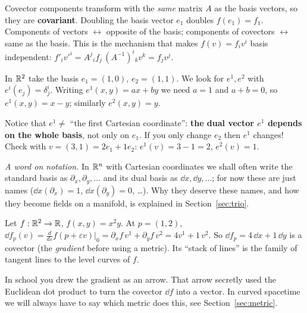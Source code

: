 \begin{intuition}[{covariant = changes like the basis}]
Covector components transform with the \emph{same} matrix $A$ as the basis vectors, so they are \textbf{covariant}. Doubling the basis vector $e_1$ doubles $f(e_1)=f_1$. Components of vectors $\leftrightarrow$ opposite of the basis; components of covectors $\leftrightarrow$ same as the basis. This is the mechanism that makes $f(v)=f_iv^i$ basis independent:
$f'_iv'^i=A^j{}_if_j\,(A^{-1})^i{}_kv^k=f_jv^j$.
\end{intuition}

\begin{example}
In $\mathbb{R}^2$ take the basis $e_1=(1,0)$, $e_2=(1,1)$. We look for $e^{1},e^{2}$ with $e^{i}(e_j)=\delta^i_j$. Writing $e^{1}(x,y)=ax+by$ we need $a=1$ and $a+b=0$, so $e^{1}(x,y)=x-y$; similarly $e^{2}(x,y)=y$.

Notice that $e^{1}\neq$ ``the first Cartesian coordinate'': \textbf{the dual vector $e^{1}$ depends on the whole basis}, not only on $e_1$. If you only change $e_2$ then $e^{1}$ changes! Check with $v=(3,1)=2e_1+1e_2$: $e^{1}(v)=3-1=2$, $e^{2}(v)=1$. \checkmark
\end{example}

\emph{A word on notation.} In $\mathbb{R}^n$ with Cartesian coordinates we shall often write the standard basis as
$\partial_x,\partial_y,\dots$ and its dual basis as $\dd x,\dd y,\dots$; for now these are just names
($\dd x(\partial_x)=1$, $\dd x(\partial_y)=0$, \dots). Why they deserve these names, and how they become fields
on a manifold, is explained in Section~\ref{sec:trio}.

\begin{example}
Let $f:\mathbb{R}^2\to\mathbb{R}$, $f(x,y)=x^2y$. At $p=(1,2)$, $\dd f_p(v)=\frac{d}{d\varepsilon}f(p+\varepsilon v)|_0=\partial_xf\,v^1+\partial_yf\,v^2=4v^1+1\,v^2$. So $\dd f_p=4\,\dd x+1\,\dd y$ is a covector (the \emph{gradient} before using a metric). Its ``stack of lines'' is the family of tangent lines to the level curves of $f$.
\end{example}

\begin{pitfall}
In school you drew the gradient as an arrow. That arrow secretly used the Euclidean dot product to turn the covector $\dd f$ into a vector. In curved spacetime we will always have to say which metric does this, see Section~\ref{sec:metric}.
\end{pitfall}

